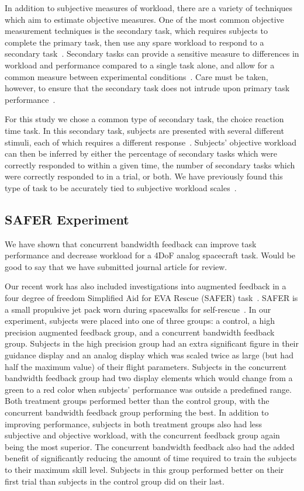 \documentclass[float=false, crop=false]{standalone}
\begin{document}
In addition to subjective measures of workload, there are a variety of techniques which aim to estimate objective measures.
One of the most common objective measurement techniques is the secondary task, which requires subjects to complete the primary task, then use any spare workload to respond to a secondary task~\cite{gawron2008human}.
Secondary tasks can provide a sensitive measure to differences in workload and performance compared to a single task alone, and allow for a common measure between experimental conditions~\cite{slocum1971meaningful}.
Care must be taken, however, to ensure that the secondary task does not intrude upon primary task performance~\cite{williges1979behavioral}.

For this study we chose a common type of secondary task, the choice reaction time task.
In this secondary task, subjects are presented with several different stimuli, each of which requires a different response~\cite{lysaght1989operator}.
Subjects' objective workload can then be inferred by either the percentage of secondary tasks which were correctly responded to within a given time, the number of secondary tasks which were correctly responded to in a trial, or both.
We have previously found this type of task to be accurately tied to subjective workload scales~\cite{Karasinski2017}.


\subsection{SAFER Experiment}
We have shown that concurrent bandwidth feedback can improve task performance and decrease workload for a 4DoF analog spacecraft task.
Would be good to say that we have submitted journal article for review.

Our recent work has also included investigations into augmented feedback in a four degree of freedom Simplified Aid for EVA Rescue (SAFER) task~\cite{Karasinski2017}.
SAFER is a small propulsive jet pack worn during spacewalks for self-rescue~\cite{Vassigh1998}.
In our experiment, subjects were placed into one of three groups: a control, a high precision augmented feedback group, and a concurrent bandwidth feedback group.
Subjects in the high precision group had an extra significant figure in their guidance display and an analog display which was scaled twice as large (but had half the maximum value) of their flight parameters.
Subjects in the concurrent bandwidth feedback group had two display elements which would change from a green to a red color when subjects' performance was outside a predefined range.
Both treatment groups performed better than the control group, with the concurrent bandwidth feedback group performing the best.
In addition to improving performance, subjects in both treatment groups also had less subjective and objective workload, with the concurrent feedback group again being the most superior.
The concurrent bandwidth feedback also had the added benefit of significantly reducing the amount of time required to train the subjects to their maximum skill level.
Subjects in this group performed better on their first trial than subjects in the control group did on their last.
\end{document}
